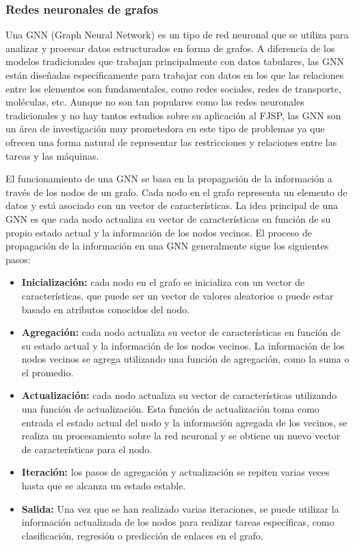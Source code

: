 \subsubsection{Redes neuronales de grafos}
Una GNN (Graph Neural Network)\cite{pytorch-geometric} es un tipo de red
neuronal que se utiliza para analizar y procesar datos estructurados en forma
de grafos. A diferencia de los modelos tradicionales que trabajan
principalmente con datos tabulares, las GNN están diseñadas específicamente
para trabajar con datos en los que las relaciones entre los elementos son
fundamentales, como redes sociales, redes de transporte, moléculas, etc. Aunque
no son tan populares como las redes neuronales tradicionales y no hay tantos
estudios sobre su aplicación al FJSP, las GNN son un área de investigación muy
prometedora en este tipo de problemas ya que ofrecen una forma natural de
representar las restricciones y relaciones entre las tareas y las
máquinas.\medskip

El funcionamiento de una GNN se basa en la propagación de la
información\cite{Message_parrs} a través de los nodos de un grafo. Cada nodo en
el grafo representa un elemento de datos y está asociado con un vector de
características. La idea principal de una GNN es que cada nodo actualiza su
vector de características en función de su propio estado actual y la
información de los nodos vecinos. El proceso de propagación de la información
en una GNN generalmente sigue los siguientes pasos:

\begin{itemize}
      \item \textbf{Inicialización:} cada nodo en el grafo se inicializa con un vector de características,
            que puede ser un vector de valores aleatorios o puede estar basado en atributos conocidos del nodo.
      \item \textbf{Agregación:} cada nodo actualiza su vector de características en función de su estado
            actual y la información de los nodos vecinos. La información de los nodos vecinos se agrega utilizando
            una función de agregación, como la suma o el promedio.
      \item \textbf{Actualización:} cada nodo actualiza su vector de características utilizando una función
            de actualización. Esta función de actualización toma como entrada el estado actual del nodo y la
            información agregada de los vecinos, se realiza un procesamiento sobre la red neuronal y se obtiene
            un nuevo vector de características para el nodo.
      \item \textbf{Iteración:} los pasos de agregación y actualización se repiten varias veces hasta que
            se alcanza un estado estable.
      \item \textbf{Salida:} Una vez que se han realizado varias iteraciones, se puede utilizar la información
            actualizada de los nodos para realizar tareas específicas, como clasificación, regresión o predicción de
            enlaces en el grafo.
\end{itemize}

